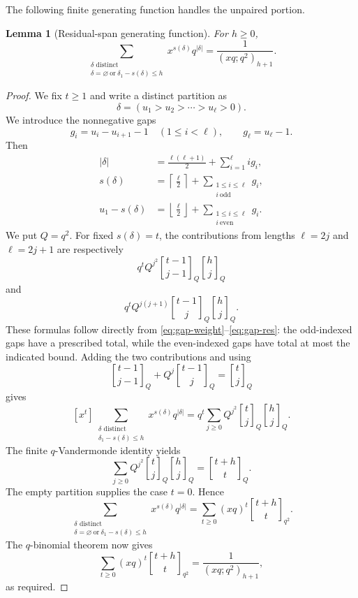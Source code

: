 \documentclass[11pt]{article}
\newtheorem{lemma}[theorem]{Lemma}
\theoremstyle{definition}
\theoremstyle{remark}
\newcommand{\qbinom}[3][]{%
  \genfrac{[}{]}{0pt}{}{#2}{#3}_{#1}%
}
\begin{document}
The following finite generating function handles the unpaired
portion.

\begin{lemma}[Residual-span generating function]\label{lem:residual-span}
For $h\geq0$,
\[
 \sum_{\substack{\delta\text{ distinct}\\
                  \delta=\varnothing\ \text{or}\ 
                  \delta_1-s(\delta)\leq h}}
 x^{s(\delta)}q^{|\delta|}
 =\frac{1}{(xq;q^2)_{h+1}}.
\]
\end{lemma}

\begin{proof}
We fix $t\geq1$ and write a distinct partition as
\[
 \delta=(u_1>u_2>\cdots>u_\ell>0).
\]
We introduce the nonnegative gaps
\[
 g_i=u_i-u_{i+1}-1\quad(1\leq i<\ell),
 \qquad g_\ell=u_\ell-1.
\]
Then
\begin{align}
 |\delta|&=\frac{\ell(\ell+1)}2+\sum_{i=1}^{\ell}i g_i,\label{eq:gap-weight}\\
 s(\delta)&=\left\lceil\frac\ell2\right\rceil
             +\sum_{\substack{1\leq i\leq\ell\\ i\ \mathrm{odd}}}g_i,\label{eq:gap-alt}\\
 u_1-s(\delta)&=\left\lfloor\frac\ell2\right\rfloor
             +\sum_{\substack{1\leq i\leq\ell\\ i\ \mathrm{even}}}g_i.\label{eq:gap-res}
\end{align}
We put $Q=q^2$.  For fixed $s(\delta)=t$, the contributions from lengths
$\ell=2j$ and $\ell=2j+1$ are respectively
\[
 q^tQ^{j^2}
 \qbinom[Q]{t-1}{j-1}\qbinom[Q]{h}{j}
\]
and
\[
 q^tQ^{j(j+1)}
 \qbinom[Q]{t-1}{j}\qbinom[Q]{h}{j}.
\]
These formulas follow directly from
\eqref{eq:gap-weight}--\eqref{eq:gap-res}: the odd-indexed gaps have a
prescribed total, while the even-indexed gaps have total at most the indicated
bound.  Adding the two contributions and using
\[
 \qbinom[Q]{t-1}{j-1}+Q^j\qbinom[Q]{t-1}{j}
 =\qbinom[Q]{t}{j}
\]
gives
\[
 [x^t]\sum_{\substack{\delta\text{ distinct}\\
                  \delta_1-s(\delta)\leq h}}
 x^{s(\delta)}q^{|\delta|}
 =q^t\sum_{j\geq0}Q^{j^2}
   \qbinom[Q]{t}{j}\qbinom[Q]{h}{j}.
\]
The finite $q$-Vandermonde identity yields
\[
 \sum_{j\geq0}Q^{j^2}
   \qbinom[Q]{t}{j}\qbinom[Q]{h}{j}
 =\qbinom[Q]{t+h}{t}.
\]
The empty partition supplies the case $t=0$.  Hence
\[
 \sum_{\substack{\delta\text{ distinct}\\
                  \delta=\varnothing\ \text{or}\ 
                  \delta_1-s(\delta)\leq h}}
 x^{s(\delta)}q^{|\delta|}
 =\sum_{t\geq0}(xq)^t\qbinom[q^2]{t+h}{t}.
\]
The $q$-binomial theorem now gives
\[
 \sum_{t\geq0}(xq)^t\qbinom[q^2]{t+h}{t}
 =\frac{1}{(xq;q^2)_{h+1}},
\]
as required.
\end{proof}
\end{document}
